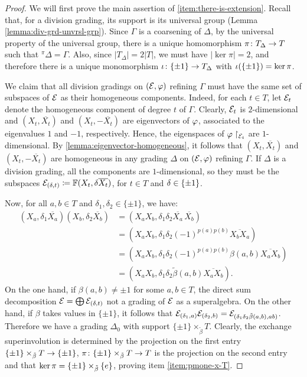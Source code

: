 \begin{proof}
    We will first prove the main assertion of \eqref{item:there-is-extension}. 
	Recall that, for a division grading, its support is its universal group (Lemma \ref{lemma:div-grd-unvrsl-grp}).
	Since $\Gamma$ is a coarsening of $\Delta$, by the universal property of the universal group, there is a unique homomorphism $\pi\colon T_\Delta \to T$ such that ${}^{\pi}\Delta = \Gamma$.
	Also, since $|T_\Delta| = 2 |T|$, we must have $|\ker \pi| = 2$, and therefore there is a unique monomorphism $\iota\colon \{ \pm 1 \} \to T_\Delta$ with $\iota(\{ \pm 1 \}) = \ker \pi$. 

	We claim that all division gradings on $(\mathcal E, \varphi)$ refining $\Gamma$ must have the same set of subspaces of $\mathcal E$ as their homogeneous components.
	Indeed, for each $t\in T$, let $\mathcal E_t$ denote the homogeneous component of degree $t$ of $\Gamma$. 
	Clearly, $\mathcal E_t$ is $2$-dimensional and $(X_t, \overline{X_t})$ and $(X_t, -\overline{X_t})$ are eigenvectors of $\varphi$, associated to the eigenvalues $1$ and $-1$, respectively.
	Hence, the eigenspaces of $\varphi \restriction_{\mathcal E_t}$ are $1$-dimensional. 
	By \cref{lemma:eigenvector-homogeneous}, it follows that $(X_t, \overline{X_t})$ and $(X_t, -\overline{X_t})$ are homogeneous in any grading $\Delta$ on $(\mathcal E, \varphi)$ refining $\Gamma$. 
	If $\Delta$ is a division grading, all the components are $1$-dimensional, so they must be the subspaces $\mathcal E_{(\delta, t)} \coloneqq \mathbb{F} (X_t, \delta \overline{X_t})$, for $t\in T$ and $\delta \in \{ \pm 1 \}$. 
	
	Now, for all $a, b \in T$ and $\delta_1, \delta_2 \in \{ \pm 1 \}$, we have:
	\begin{align*}
		(X_{a}, \delta_1 \overline{X_{a}})(X_{b}, \delta_2 \overline{X_{b}}) & = (X_{a} X_{b}, \delta_1 \delta_2 \overline{X_{a}} \,\overline{X_{b}})               \\
		                                                                     & = (X_{a} X_{b}, \delta_1 \delta_2 (-1)^{p(a)p(b)} \overline{X_{b}X_{a}})             \\
		                                                                     & =(X_{a} X_{b}, \delta_1 \delta_2 (-1)^{p(a)p(b)} \beta(a, b) \overline{X_{a} X_{b}}) \\
		                                                                     & = (X_{a} X_{b}, \delta_1 \delta_2 \tilde\beta (a,b) \overline{X_{a} X_{b}}).
	\end{align*}
	On the one hand, if $\beta(a, b) \neq \pm 1$ for some $a,b \in T$, the direct sum decomposition $\mathcal E = \bigoplus \mathcal E_{(\delta, t)}$ not a grading of $\mathcal E$ as a superalgebra. 
	On the other hand, if $\beta$ takes values in $\{ \pm 1 \}$, it follows that $\mathcal E_{(\delta_1, a)} \mathcal E_{(\delta_2, b)} = \mathcal E_{(\delta_1 \delta_2 \tilde\beta (a,b), ab)}$. 
	Therefore we have a grading $\Delta_0$ with support $\{ \pm 1\} \times_{\tilde\beta} T$. 
	Clearly, the exchange superinvolution is determined by the projection on the first entry $\{ \pm 1\} \times_{\tilde\beta} T \to \{ \pm 1 \}$, $\pi\colon \{ \pm 1\} \times_{\tilde\beta} T \to T$ is the projection on the second entry and that $\ker \pi = \{ \pm 1 \} \times_{\tilde\beta} \{ e \}$, proving item \eqref{item:pmone-x-T}. 
	

\end{proof}
